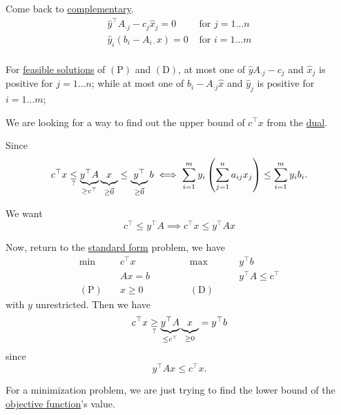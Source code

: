 Come back to \hyperref[def:complementary]{complementary}.
\[
	\begin{split}
		\hat{y}^{\top} A_{\cdot j} - c_{j}\hat{x}_j = 0 &\text{ for }j = 1\dots n\\
		\hat{y}_i(b_{i} - A_{i\cdot }x) = 0 &\text{ for }i = 1\dots m\\
	\end{split}
\]

\begin{note}
	For \hyperref[def:feasible-solution]{feasible solutions} of \((\mathrm{P})\) and \((\mathrm{D})\), at most one of \(\hat{y}A_{\cdot j} - c_{j}\) and \(\hat{x}_j\) is positive for \(j = 1\dots n\);
	while at most one of \(b_{i} - A_{\cdot j}\hat{x}\) and \(\hat{y}_j\) is positive for \(i = 1\dots m\);
\end{note}

\begin{problem}
We are looking for a way to find out the upper bound of \(c^{\top}x\) from the \hyperref[def:dual]{dual}.
\end{problem}
\begin{answer}
	Since
	\[
		c^{\top}x \underset{?}{\leq}
		\underbrace{y^{\top} A }_{\geq c^{\top}}\underbrace{\vphantom{y^{\top}A}x}_{\geq \vec{0}}
		\leq \underbrace{y^{\top}}_{\geq \vec{0}} b
		\iff \sum\limits_{i=1}^{m} y_{i} \left( \sum\limits_{j=1}^{n} a_{ij}x_{j} \right)
		\leq \sum\limits_{i=1}^{m} y_{i}b_{i}.
	\]

	We want
	\[
		c^{\top}\leq y^{\top}A\implies c^{\top}x\leq y^{\top} Ax
	\]

	Now, return to the \hyperref[def:standard-form]{standard form} problem, we have
	\[
		\begin{alignedat}{5}
			\min~&c^{\top}x\qquad\qquad &&\max ~ &&y^{\top}b\\
			&Ax = b && &&y^{\top}A\leq c^{\top}\\
			(\mathrm{P})\quad&x\geq  0 &&(\mathrm{D})\quad&&
		\end{alignedat}
	\]
	with \(y\) unrestricted. Then we have
	\[
		c^{\top}x\underset{?}{\geq} \underbrace{y^{\top}A}_{\leq c^{\top}}\underbrace{\vphantom{y^{\top}A}x}_{\geq 0} = y^{\top} b
	\]
	since \[
		y^{\top}Ax\leq c^{\top}x.
	\]
\end{answer}

\begin{intuition}
	For a minimization problem, we are just trying to find the lower bound of the \hyperref[def:objective-function]{objective function}'s value.
\end{intuition}


